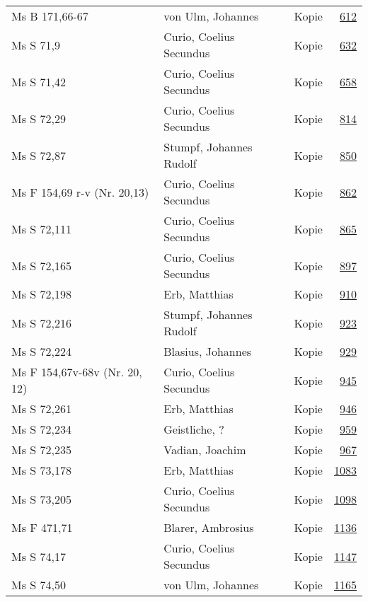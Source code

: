 \documentclass[10pt,a4paper,landscape]{report}
\begin{document}
\begin{longtable}{p{16cm}p{4cm}lr}
Ms B 171,66-67	&	von Ulm, Johannes	&	Kopie	&	\href{http://130.60.24.72/assignment/612}{612}\\
Ms S 71,9	&	Curio, Coelius Secundus	&	Kopie	&	\href{http://130.60.24.72/assignment/632}{632}\\
Ms S 71,42	&	Curio, Coelius Secundus	&	Kopie	&	\href{http://130.60.24.72/assignment/658}{658}\\
Ms S 72,29	&	Curio, Coelius Secundus	&	Kopie	&	\href{http://130.60.24.72/assignment/814}{814}\\
Ms S 72,87	&	Stumpf, Johannes Rudolf	&	Kopie	&	\href{http://130.60.24.72/assignment/850}{850}\\
Ms F 154,69 r-v (Nr. 20,13)	&	Curio, Coelius Secundus	&	Kopie	&	\href{http://130.60.24.72/assignment/862}{862}\\
Ms S 72,111	&	Curio, Coelius Secundus	&	Kopie	&	\href{http://130.60.24.72/assignment/865}{865}\\
Ms S 72,165	&	Curio, Coelius Secundus	&	Kopie	&	\href{http://130.60.24.72/assignment/897}{897}\\
Ms S 72,198	&	Erb, Matthias	&	Kopie	&	\href{http://130.60.24.72/assignment/910}{910}\\
Ms S 72,216	&	Stumpf, Johannes Rudolf	&	Kopie	&	\href{http://130.60.24.72/assignment/923}{923}\\
Ms S 72,224	&	Blasius, Johannes	&	Kopie	&	\href{http://130.60.24.72/assignment/929}{929}\\
Ms F 154,67v-68v (Nr. 20, 12)	&	Curio, Coelius Secundus	&	Kopie	&	\href{http://130.60.24.72/assignment/945}{945}\\
Ms S 72,261	&	Erb, Matthias	&	Kopie	&	\href{http://130.60.24.72/assignment/946}{946}\\
Ms S 72,234	&	Geistliche, ?	&	Kopie	&	\href{http://130.60.24.72/assignment/959}{959}\\
Ms S 72,235	&	Vadian, Joachim	&	Kopie	&	\href{http://130.60.24.72/assignment/967}{967}\\
Ms S 73,178	&	Erb, Matthias	&	Kopie	&	\href{http://130.60.24.72/assignment/1083}{1083}\\
Ms S 73,205	&	Curio, Coelius Secundus	&	Kopie	&	\href{http://130.60.24.72/assignment/1098}{1098}\\
Ms F 471,71	&	Blarer, Ambrosius	&	Kopie	&	\href{http://130.60.24.72/assignment/1136}{1136}\\
Ms S 74,17	&	Curio, Coelius Secundus	&	Kopie	&	\href{http://130.60.24.72/assignment/1147}{1147}\\
Ms S 74,50	&	von Ulm, Johannes	&	Kopie	&	\href{http://130.60.24.72/assignment/1165}{1165}\\

\end{longtable}
\end{document}
